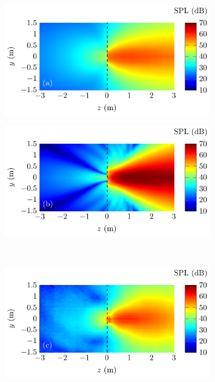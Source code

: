 \begin{figure}[H]
    \centering
    \begin{subfigure}{0.49\textwidth}
        \centering
        \includegraphics[width = \textwidth]{fig/ComparePalAudio2D_Simulation_315Hz.pdf}
    \end{subfigure}
    \begin{subfigure}{0.49\textwidth}
        \centering
        \includegraphics[width = \textwidth]{fig/ComparePalAudio2D_Simulation_800Hz.pdf}
    \end{subfigure}
    \\
    \begin{subfigure}{0.49\textwidth}
        \centering
        \includegraphics[width = \textwidth]{fig/ComparePalAudio2D_Experiment_315Hz.pdf}

\end{subfigure}
\end{figure}
